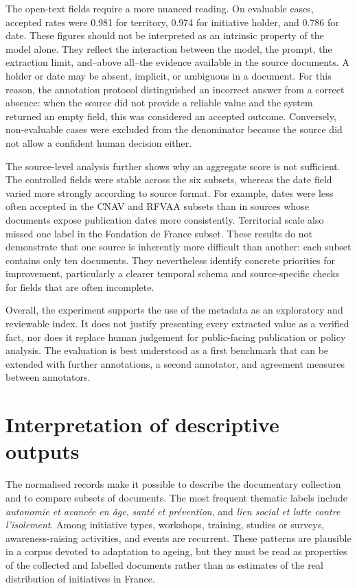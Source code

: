 \documentclass[
11pt,
english,
singlespacing,
headsepline,
]{MastersDoctoralThesis}
\begin{document}
The open-text fields require a more nuanced reading. On evaluable cases,
accepted rates were 0.981 for territory, 0.974 for initiative holder, and
0.786 for date. These figures should not be interpreted as an intrinsic
property of the model alone. They reflect the interaction between the model,
the prompt, the extraction limit, and--above all--the evidence available in the
source documents. A holder or date may be absent, implicit, or ambiguous in a
document. For this reason, the annotation protocol distinguished an incorrect
answer from a correct absence: when the source did not provide a reliable value
and the system returned an empty field, this was considered an accepted
outcome. Conversely, non-evaluable cases were excluded from the denominator
because the source did not allow a confident human decision either.

The source-level analysis further shows why an aggregate score is not
sufficient. The controlled fields were stable across the six subsets, whereas
the date field varied more strongly according to source format. For example,
dates were less often accepted in the CNAV and RFVAA subsets than in sources
whose documents expose publication dates more consistently. Territorial scale
also missed one label in the Fondation de France subset. These results do not
demonstrate that one source is inherently more difficult than another: each
subset contains only ten documents. They nevertheless identify concrete
priorities for improvement, particularly a clearer temporal schema and
source-specific checks for fields that are often incomplete.

Overall, the experiment supports the use of the metadata as an exploratory and
reviewable index. It does not justify presenting every extracted value as a
verified fact, nor does it replace human judgement for public-facing
publication or policy analysis. The evaluation is best understood as a first
benchmark that can be extended with further annotations, a second annotator,
and agreement measures between annotators.

\section{Interpretation of descriptive outputs}

The normalised records make it possible to describe the documentary collection
and to compare subsets of documents. The most frequent thematic labels include
\textit{autonomie et avanc\'ee en \^age}, \textit{sant\'e et pr\'evention}, and
\textit{lien social et lutte contre l'isolement}. Among initiative types,
workshops, training, studies or surveys, awareness-raising activities, and
events are recurrent. These patterns are plausible in a corpus devoted to
adaptation to ageing, but they must be read as properties of the collected and
labelled documents rather than as estimates of the real distribution of
initiatives in France.
\end{document}
